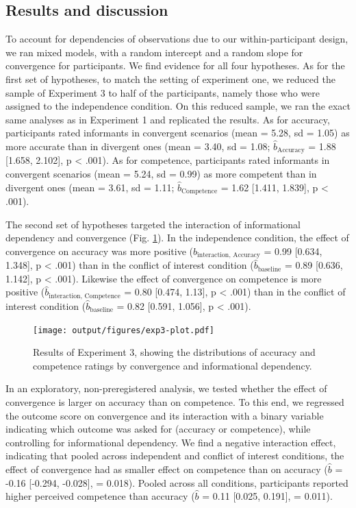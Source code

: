 \documentclass[
  doc,floatsintext]{apa6}
\begin{document}
\subsection{Results and discussion}\label{results-and-discussion-2}

To account for dependencies of observations due to our within-participant design, we ran mixed models, with a random intercept and a random slope for convergence for participants. We find evidence for all four hypotheses. As for the first set of hypotheses, to match the setting of experiment one, we reduced the sample of Experiment 3 to half of the participants, namely those who were assigned to the independence condition. On this reduced sample, we ran the exact same analyses as in Experiment 1 and replicated the results. As for accuracy, participants rated informants in convergent scenarios (mean = 5.28, sd = 1.05) as more accurate than in divergent ones (mean = 3.40, sd = 1.08; \(\hat{b}_{\text{Accuracy}}\) = 1.88 {[}1.658, 2.102{]}, p \textless{} .001). As for competence, participants rated informants in convergent scenarios (mean = 5.24, sd = 0.99) as more competent than in divergent ones (mean = 3.61, sd = 1.11; \(\hat{b}_{\text{Competence}}\) = 1.62 {[}1.411, 1.839{]}, p \textless{} .001).

The second set of hypotheses targeted the interaction of informational dependency and convergence (Fig. \ref{fig:exp3-plot}). In the independence condition, the effect of convergence on accuracy was more positive (\(\hat{b}_{\text{interaction, Accuracy}}\) = 0.99 {[}0.634, 1.348{]}, p \textless{} .001) than in the conflict of interest condition (\(\hat{b}_{\text{baseline}}\) = 0.89 {[}0.636, 1.142{]}, p \textless{} .001). Likewise the effect of convergence on competence is more positive (\(\hat{b}_{\text{interaction, Competence}}\) = 0.80 {[}0.474, 1.13{]}, p \textless{} .001) than in the conflict of interest condition (\(\hat{b}_{\text{baseline}}\) = 0.82 {[}0.591, 1.056{]}, p \textless{} .001).



\begin{figure}
\centering
\texttt{[image: output/figures/exp3-plot.pdf]}
\caption{\label{fig:exp3-plot}Results of Experiment 3, showing the distributions of accuracy and competence ratings by convergence and informational dependency.}
\end{figure}

In an exploratory, non-preregistered analysis, we tested whether the effect of convergence is larger on accuracy than on competence. To this end, we regressed the outcome score on convergence and its interaction with a binary variable indicating which outcome was asked for (accuracy or competence), while controlling for informational dependency. We find a negative interaction effect, indicating that pooled across independent and conflict of interest conditions, the effect of convergence had as smaller effect on competence than on accuracy (\(\hat{b}\) = -0.16 {[}-0.294, -0.028{]}, = 0.018). Pooled across all conditions, participants reported higher perceived competence than accuracy (\(\hat{b}\) = 0.11 {[}0.025, 0.191{]}, = 0.011).
\end{document}
